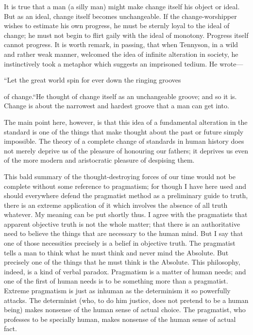 It is true that a man (a silly man) might make change itself his object or ideal. But as an ideal, change itself becomes unchangeable. If the change-worshipper wishes to estimate his own progress, he must be sternly loyal to the ideal of change; he must not begin to flirt gaily with the ideal of monotony. Progress itself cannot progress. It is worth remark, in passing, that when Tennyson, in a wild and rather weak manner, welcomed the idea of infinite alteration in society, he instinctively took a metaphor which suggests an imprisoned tedium. He wrote—

“Let the great world spin for ever down the ringing grooves

of change.“He thought of change itself as an unchangeable groove; and so it is. Change is about the narrowest and hardest groove that a man can get into.

The main point here, however, is that this idea of a fundamental alteration in the standard is one of the things that make thought about the past or future simply impossible. The theory of a complete change of standards in human history does not merely deprive us of the pleasure of honouring our fathers; it deprives us even of the more modern and aristocratic pleasure of despising them.

This bald summary of the thought-destroying forces of our time would not be complete without some reference to pragmatism; for though I have here used and should everywhere defend the pragmatist method as a preliminary guide to truth, there is an extreme application of it which involves the absence of all truth whatever. My meaning can be put shortly thus. I agree with the pragmatists that apparent objective truth is not the whole matter; that there is an authoritative need to believe the things that are necessary to the human mind. But I say that one of those necessities precisely is a belief in objective truth. The pragmatist tells a man to think what he must think and never mind the Absolute. But precisely one of the things that he must think is the Absolute. This philosophy, indeed, is a kind of verbal paradox. Pragmatism is a matter of human needs; and one of the first of human needs is to be something more than a pragmatist. Extreme pragmatism is just as inhuman as the determinism it so powerfully attacks. The determinist (who, to do him justice, does not pretend to be a human being) makes nonsense of the human sense of actual choice. The pragmatist, who professes to be specially human, makes nonsense of the human sense of actual fact.

